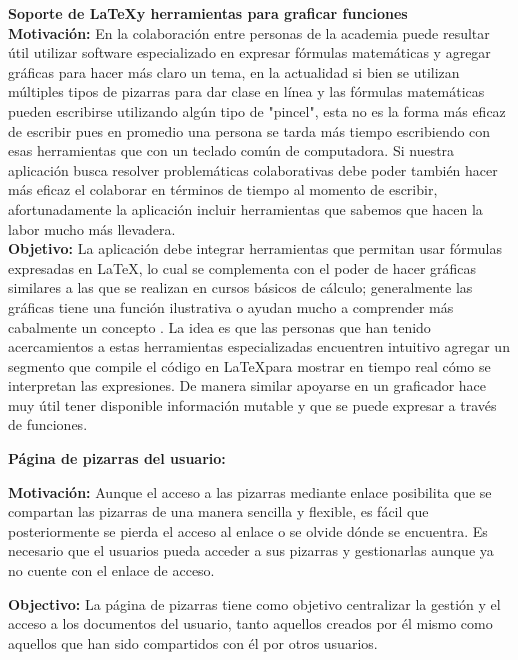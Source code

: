 \documentclass[a4paper, oneside, final]{scrartcl}
\begin{document}
\noindent
\textbf{\large Soporte de \LaTeX y herramientas para graficar funciones}\\
    \textbf{Motivación: } En la colaboración entre personas de la academia puede resultar útil utilizar software especializado en expresar fórmulas matemáticas y agregar gráficas para hacer más claro un tema, en la actualidad si bien se utilizan múltiples tipos de pizarras para dar clase en línea y las fórmulas matemáticas pueden escribirse utilizando algún tipo de "pincel", esta no es la forma más eficaz de escribir pues en promedio una persona se tarda más tiempo escribiendo con esas herramientas que con un teclado común de computadora. Si nuestra aplicación busca resolver problemáticas colaborativas debe poder también hacer más eficaz el colaborar en términos de tiempo al momento de escribir, afortunadamente la aplicación incluir herramientas que sabemos que hacen la labor mucho más llevadera.\\
    \textbf{Objetivo:} La aplicación debe integrar herramientas que permitan usar fórmulas expresadas en
  \LaTeX, lo cual se complementa con el poder de hacer gráficas similares a las que se realizan en cursos básicos de cálculo; generalmente las gráficas tiene una función ilustrativa o ayudan mucho a comprender más cabalmente un concepto . La idea es que las personas que han tenido acercamientos a estas herramientas especializadas encuentren intuitivo agregar un segmento que compile el código en \LaTeX para mostrar en tiempo real cómo se interpretan las expresiones. De manera similar apoyarse en un graficador hace muy útil tener disponible información mutable y que se puede expresar a través de funciones.



\noindent
\textbf{\large Página de pizarras del usuario:}

\textbf{Motivación:} Aunque el acceso a las pizarras mediante enlace posibilita que se compartan las pizarras de una manera sencilla y flexible, es fácil que posteriormente se pierda el acceso al enlace o se olvide dónde se encuentra. Es necesario que el usuarios pueda acceder a sus pizarras y gestionarlas aunque ya no cuente con el enlace de acceso.

\textbf{Objectivo:} La página de pizarras tiene como objetivo centralizar la gestión y el acceso a los documentos del usuario, tanto aquellos creados por él mismo como aquellos que han sido compartidos con él por otros usuarios.
\end{document}
